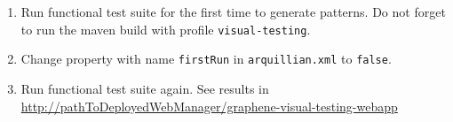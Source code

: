 \documentclass[11pt,oneside,final]{fithesis2}
\begin{document}
\begin{enumerate}
  \item Run functional test suite for the first time to generate patterns. 
  Do not forget to run the maven build with profile \texttt{visual-testing}.
  
  \item Change property with name \texttt{firstRun} in \texttt{arquillian.xml} to \texttt{false}.
  
  \item Run functional test suite again. See results in \url{http://pathToDeployedWebManager/graphene-visual-testing-webapp}
  
\end{enumerate}

    \pagestyle{plain}
    
\end{document}
